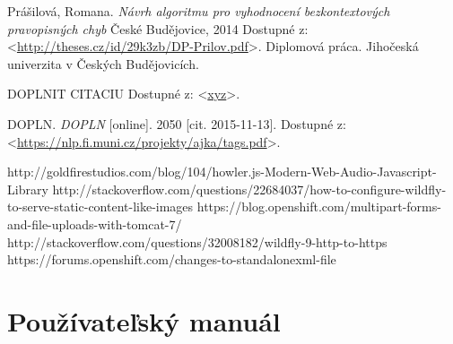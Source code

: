 \documentclass[12pt,oneside]{fithesis2}
\begin{document}
\begin{thebibliography}{59}
  		Prášilová, Romana.
  		\emph{Návrh algoritmu pro vyhodnocení bezkontextových pravopisných chyb}
  		České Budějovice, 
  		2014
  		Dostupné z: <\url{http://theses.cz/id/29k3zb/DP-Prilov.pdf}>.
  		Diplomová práca. Jihočeská univerzita v Českých Budějovicích.
  		
		DOPLNIT CITACIU
  		Dostupné z: <\url{xyz}>.
  		
  		DOPLN.
  		\emph{DOPLN}
  		[online].
  		2050
  		[cit. 2015-11-13].
  		Dostupné z: <\url{https://nlp.fi.muni.cz/projekty/ajka/tags.pdf}>.
  		
  		http://goldfirestudios.com/blog/104/howler.js-Modern-Web-Audio-Javascript-Library
  		http://stackoverflow.com/questions/22684037/how-to-configure-wildfly-to-serve-static-content-like-images
  		https://blog.openshift.com/multipart-forms-and-file-uploads-with-tomcat-7/
  		http://stackoverflow.com/questions/32008182/wildfly-9-http-to-https
  		https://forums.openshift.com/changes-to-standalonexml-file
  		
  		  			
	\end{thebibliography} 
	
    \appendix
    \chapter{Používateľský manuál} 	  %
\end{document}
